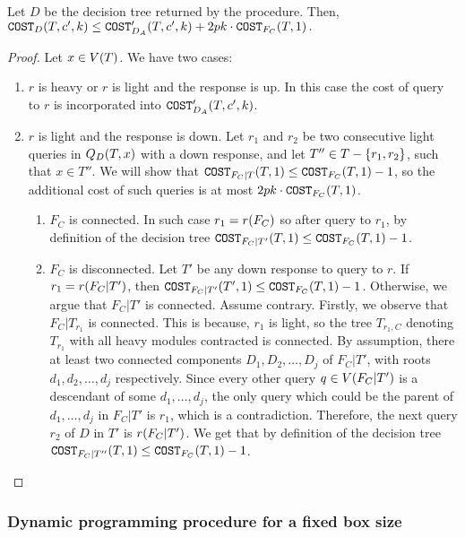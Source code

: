 \begin{lemma}
Let $D$ be the decision tree returned by the \FMergeDTs procedure. Then, $
            \texttt{COST}_{D}\mathopen{}\left( T,c',k \right)\leq\texttt{COST}'_{D_A}\mathopen{}\left( T,c',k \right)+2pk\cdot \texttt{COST}_{F_C}\mathopen{}\left( T,1 \right).
        $
\begin{proof}
     Let $x\in V\mathopen{}\left( T \right)$. We have two cases:
    \begin{enumerate}
        \item $r$ is heavy or $r$ is light and the response is up. In this case the cost of query to $r$ is incorporated into $\texttt{COST}'_{D_A}\mathopen{}\left( T,c',k \right)$.
        \item $r$ is light and the response is down. Let  $r_1$ and $r_2$ be two consecutive light queries in $Q_D\mathopen{}\left( T,x \right)$ with a down response, and let $T''\in T-\mathopen{}\left\{ r_1, r_2 \right\}$, such that $x\in T''$. We will show that $\texttt{COST}_{F_C|T}\mathopen{}\left( T,1 \right)\leq \texttt{COST}_{F_C}\mathopen{}\left( T,1 \right)-1$, so the additional cost of such queries is at most $2pk\cdot \texttt{COST}_{F_C}\mathopen{}\left( T,1 \right)$.
        \begin{enumerate}
            \item $F_C$ is connected. In such case $r_1=r\mathopen{}\left( F_C \right)$ so after query to $r_1$, by definition of the decision tree $\texttt{COST}_{F_C|T'}\mathopen{}\left( T,1 \right)\leq \texttt{COST}_{F_C}\mathopen{}\left( T,1 \right)-1$.
            
            \item $F_C$ is disconnected. Let $T'$ be any down response to query to $r$. If $r_1=r\mathopen{}\left( F_C|T' \right)$, then $\texttt{COST}_{F_C|T'}\mathopen{}\left( T',1 \right)\leq \texttt{COST}_{F_C}\mathopen{}\left( T,1 \right) - 1$. Otherwise, we argue that $F_C|T'$ is connected. Assume contrary. Firstly, we observe that $F_{C}|T_{r_1}$ is connected. This is because, $r_1$ is light, so the tree $T_{r_1,C}$ denoting $T_{r_1}$ with all heavy modules contracted is connected. By assumption, there at least two connected components $D_1,D_2,\dots,D_j$ of $F_C|T'$, with roots $d_1,d_2,\dots, d_j$ respectively. Since every other query $q\in V\mathopen{}\left( F_C|T' \right)$ is a descendant of some $d_1,\dots,d_j$, the only query which could be the parent of $d_1,\dots, d_j$ in $F_C|T'$ is $r_1$, which is a contradiction. Therefore, the next query $r_2$ of $D$ in $T'$ is $r\mathopen{}\left( F_C|T' \right)$. We get that by definition of the decision tree $\texttt{COST}_{F_C|T''}\mathopen{}\left( T,1 \right)\leq \texttt{COST}_{F_C}\mathopen{}\left( T,1 \right)-1$.
        \end{enumerate} 
    \end{enumerate}
\end{proof}
\end{lemma}


\subsubsection{Dynamic programming procedure for a fixed box size}

